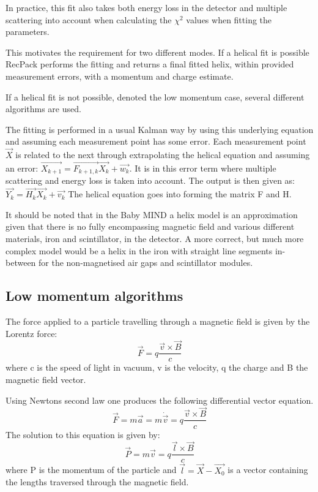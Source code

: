 In practice, this fit also takes both energy loss in the detector and multiple scattering into account when calculating the $\chi^2$ values when fitting the parameters. 

This motivates the requirement for two different modes. If a helical fit is possible RecPack performs the fitting and returns a final fitted helix, within provided measurement errors, with a momentum and charge estimate.

If a helical fit is not possible, denoted the low momentum case, several different algorithms are used.

The fitting is performed in a usual Kalman way by using this underlying equation and assuming each measurement point has some error.
Each measurement point $\vec{X}$ is related to the next through extrapolating the helical equation and assuming an error: $\vec{X_{k+1}} = \vec{F_{k+1,k}}\vec{X_k} + \vec{w_k}$. 
It is in this error term where multiple scattering and energy loss is taken into account.
The output is then given as: $\vec{Y_{k}} = \vec{H_{k}}\vec{X_k} + \vec{v_k}$
The helical equation goes into forming the matrix F and H.

It should be noted that in the Baby MIND a helix model is an approximation given that there is no fully encompassing magnetic field and various different materials, iron and scintillator, in the detector. A more correct, but much more complex model would be a helix in the iron with straight line segments in-between for the non-magnetised air gaps and scintillator modules.

\subsection{Low momentum algorithms}
The force applied to a particle travelling through a magnetic field is given by the Lorentz force:
\begin{equation}
\vec{F}=q\frac{\vec{v}\times\vec{B}}{c}
\end{equation}
where c is the speed of light in vacuum, v is the velocity, q the charge and B the magnetic field vector.

Using Newtons second law one produces the following differential vector equation.
\begin{equation}
\vec{F}=m\vec{a}=m\dot{\vec{v}}=q\frac{\vec{v}\times\vec{B}}{c}
\end{equation}
The solution to this equation is given by:
\begin{equation}
\vec{P}=m\vec{v}=q\frac{\vec{l}\times\vec{B}}{c}
\end{equation} 
where P is the momentum of the particle and $\vec{l}=\vec{X}-\vec{X_0}$ is a vector containing the lengths traversed through the magnetic field.

